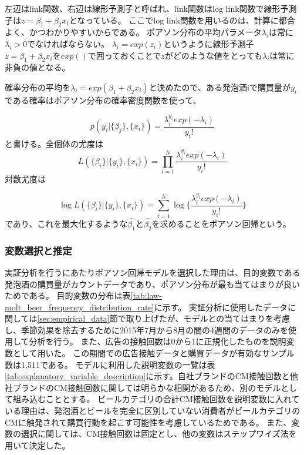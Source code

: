 \documentclass[11pt]{jsarticle}
\begin{document}
左辺はlink関数、右辺は線形予測子と呼ばれ、link関数はlog link関数で線形予測子は$z = \beta_{1} + \beta_{2}x_{i}$となっている。
ここでlog link関数を用いるのは、計算に都合よく、かつわかりやすいからである。
ポアソン分布の平均パラメータ$\lambda_{i}$は常に$\lambda_{i} > 0$でなければならない。
$\lambda_{i} = exp(z_{i})$というように線形予測子$z = \beta_{1} + \beta_{2}x_{i}$を$exp()$で囲っておくことで$z$がどのような値をとっても$\lambda_{i}$は常に非負の値となる。

確率分布の平均を$\lambda_{i} = exp(\beta_{1} + \beta_{2}x_{i})$と決めたので、ある発泡酒iで購買量が$y_{i}$である確率はポアソン分布の確率密度関数を使って、

\begin{equation}
 p(y_{i}|\{\beta_{j}\}, \{x_{i}\}) = \frac{\lambda^{y_{i}}_{i}exp(-\lambda_{i})}{y_{i}!}
\end{equation}
と書ける。全個体の尤度は
\begin{equation}
 L( \{ \beta_{i} \} | \{y_{i} \}, \{ x_{i} \} ) = \prod_{i = 1}^{N} \frac{\lambda^{y_{i}}_{i}exp(-\lambda_{i})}{y_{i}!}
\end{equation}
対数尤度は

\begin{equation}
 \log L( \{ \beta_{i} \} | \{y_{i} \}, \{ x_{i} \} ) = \sum_{i = 1}^{N} \log \{ \frac{\lambda^{y_{i}}_{i}exp(-\lambda_{i})}{y_{i}!} \}
\end{equation}
であり、これを最大化するような$\hat{\beta_{1}}$と$\hat{\beta_{2}}$を求めることをポアソン回帰という。


\subsubsection{変数選択と推定}
\label{subsec:poisson_variable}
実証分析を行うにあたりポアソン回帰モデルを選択した理由は、目的変数である発泡酒の購買量がカウントデータであり、ポアソン分布が最も当てはまりが良いためである。
目的変数の分布は表\ref{tab:law-molt_beer_frequency_distribution_rate}に示す。
実証分析に使用したデータに関しては\ref{sec:empirical_data}節で取り上げたが、モデルとの当てはまりを考慮し、季節効果を除去するために2015年7月から8月の間の4週間のデータのみを使用して分析を行う。
また、広告の接触回数は0から1に正規化したものを説明変数として用いた。
この期間での広告接触データと購買データが有効なサンプル数は1,511である。
モデルに利用した説明変数の一覧は表\ref{tab:explanatory_variable_description}に示す。自社ブランドのCM接触回数と他社ブランドのCM接触回数に関しては明らかな相関があるため、別のモデルとして組み込むこととする。
ビールカテゴリの合計CM接触回数を説明変数に入れている理由は、発泡酒とビールを完全に区別していない消費者がビールカテゴリのCMに触発されて購買行動を起こす可能性を考慮しているためである。
また、変数の選択に関しては、CM接触回数は固定とし、他の変数はステップワイズ法を用いて決定した。
\end{document}
